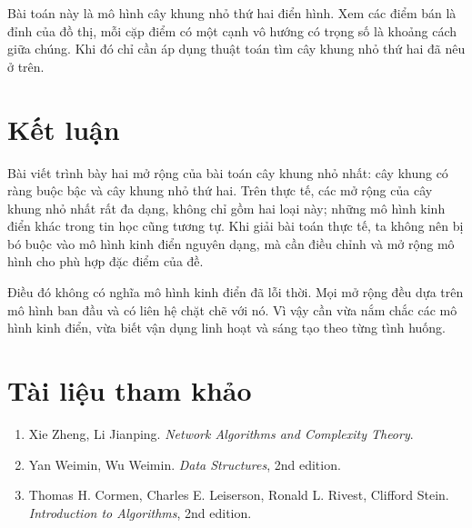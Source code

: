 \documentclass[11pt]{article}
\begin{document}
Bài toán này là mô hình cây khung nhỏ thứ hai điển hình. Xem các điểm bán là
đỉnh của đồ thị, mỗi cặp điểm có một cạnh vô hướng có trọng số là khoảng cách
giữa chúng. Khi đó chỉ cần áp dụng thuật toán tìm cây khung nhỏ thứ hai đã
nêu ở trên.

\section{Kết luận}

Bài viết trình bày hai mở rộng của bài toán cây khung nhỏ nhất: cây khung có
ràng buộc bậc và cây khung nhỏ thứ hai. Trên thực tế, các mở rộng của cây
khung nhỏ nhất rất đa dạng, không chỉ gồm hai loại này; những mô hình kinh
điển khác trong tin học cũng tương tự. Khi giải bài toán thực tế, ta không nên
bị bó buộc vào mô hình kinh điển nguyên dạng, mà cần điều chỉnh và mở rộng mô
hình cho phù hợp đặc điểm của đề.

Điều đó không có nghĩa mô hình kinh điển đã lỗi thời. Mọi mở rộng đều dựa trên
mô hình ban đầu và có liên hệ chặt chẽ với nó. Vì vậy cần vừa nắm chắc các mô hình
kinh điển, vừa biết vận dụng linh hoạt và sáng tạo theo từng tình huống.

\section*{Tài liệu tham khảo}

\begin{enumerate}
  \item Xie Zheng, Li Jianping. \textit{Network Algorithms and Complexity
  Theory}.
  \item Yan Weimin, Wu Weimin. \textit{Data Structures}, 2nd edition.
  \item Thomas H. Cormen, Charles E. Leiserson, Ronald L. Rivest, Clifford
  Stein. \textit{Introduction to Algorithms}, 2nd edition.
\end{enumerate}
\end{document}
